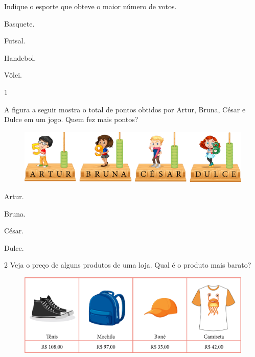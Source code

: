 Indique o esporte que obteve o maior número de votos.

\begin{escolha}[itemsep=-5pt]
\item Basquete.

\item Futsal.

\item Handebol.

\item Vôlei.
\end{escolha}

\blankpage
\vspace*{-3.4cm}


\num{1}

A figura a seguir mostra o total de pontos obtidos por Artur, Bruna, César
e Dulce em um jogo. Quem fez mais pontos?

\begin{figure}[H]
\includegraphics[width=\textwidth]{./media/image124.png}
\end{figure}

\begin{escolha}[itemsep=-5pt]
\item Artur.

\item Bruna.

\item César.

\item Dulce.
\end{escolha}

\num{2} Veja o preço de alguns produtos de uma loja. Qual é o produto mais
barato?

\begin{figure}[H]
\includegraphics[width=\textwidth]{./media/image125.png}
\end{figure}

